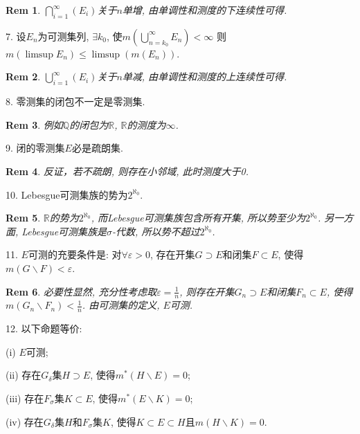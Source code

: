 \documentclass[UTF8]{article}
\newtheorem*{remark}{Rem}
\begin{document}
    \begin{remark}
        $\bigcap_{i=1}^{\infty} (E_i)$关于$n$单增, 由单调性和测度的下连续性可得.\par
    \end{remark}
    7. 设$E_n$为可测集列, $\exists k_0$, 使$m\left(\bigcup_{n=k_0}^{\infty}E_n\right)<\infty$ 则$m\left(\limsup E_n\right)\leqslant \limsup (m(E_n))$.\par
    \begin{remark}
        $\bigcup_{i=1}^{\infty} (E_i)$关于$n$单减, 由单调性和测度的上连续性可得.\par
    \end{remark}
    8. 零测集的闭包不一定是零测集.\par
    \begin{remark}
        例如$\mathbb{Q}$的闭包为$\mathbb{R}$, $\mathbb{R}$的测度为$\infty$.\par
    \end{remark}
    9. 闭的零测集$E$必是疏朗集.\par
    \begin{remark}
        反证，若不疏朗, 则存在小邻域, 此时测度大于0.\par
    \end{remark}
    10. Lebesgue可测集族的势为$2^{\aleph_0}$.\par
    \begin{remark}
        $\mathbb{R}$的势为$2^{\aleph_0}$, 而Lebesgue可测集族包含所有开集, 所以势至少为$2^{\aleph_0}$. 另一方面, Lebesgue可测集族是$\sigma$-代数, 所以势不超过$2^{\aleph_0}$.\par
    \end{remark}
    11. $E$可测的充要条件是: 对$\forall \varepsilon >0$, 存在开集$G\supset E$和闭集$F\subset E$, 使得$m(G\backslash F) < \varepsilon$.
    \begin{remark}
        必要性显然, 充分性考虑取$\varepsilon = \frac{1}{n}$, 则存在开集$G_n\supset E$和闭集$F_n\subset E$, 使得$m(G_n\backslash F_n) < \frac{1}{n}$. 由可测集的定义, $E$可测.\par
    \end{remark}
    12. 以下命题等价:\par
        (i) $E$可测;\par
        (ii) 存在$G_{\delta}$集$H\supset E$, 使得$m^{*}(H\backslash E)=0$;\par
        (iii) 存在$F_{\sigma}$集$K\subset E$, 使得$m^{*}(E\backslash K)=0$;\par
        (iv) 存在$G_{\delta}$集$H$和$F_{\sigma}$集$K$, 使得$K\subset E\subset H$且$m(H\backslash K)=0$.\par
\end{document}
